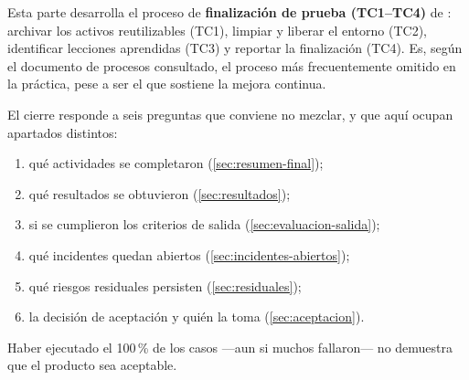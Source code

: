 
\begin{notanormativa}
Esta parte desarrolla el proceso de \textbf{finalización de prueba (TC1–TC4)} de :
archivar los activos reutilizables (TC1), limpiar y liberar el entorno (TC2), identificar
lecciones aprendidas (TC3) y reportar la finalización (TC4). Es, según el documento de procesos
consultado, el proceso más frecuentemente omitido en la práctica, pese a ser el que sostiene la
mejora continua.
\end{notanormativa}

\begin{notanormativa}
El cierre responde a seis preguntas que conviene no mezclar, y que aquí ocupan apartados
distintos:
\begin{enumerate}
  \item qué actividades se completaron (\ref{sec:resumen-final});
  \item qué resultados se obtuvieron (\ref{sec:resultados});
  \item si se cumplieron los criterios de salida (\ref{sec:evaluacion-salida});
  \item qué incidentes quedan abiertos (\ref{sec:incidentes-abiertos});
  \item qué riesgos residuales persisten (\ref{sec:residuales});
  \item la decisión de aceptación y quién la toma (\ref{sec:aceptacion}).
\end{enumerate}
Haber ejecutado el 100\,\% de los casos —aun si muchos fallaron— no demuestra que el producto
sea aceptable.
\end{notanormativa}

\begin{observacion}
\end{observacion}

